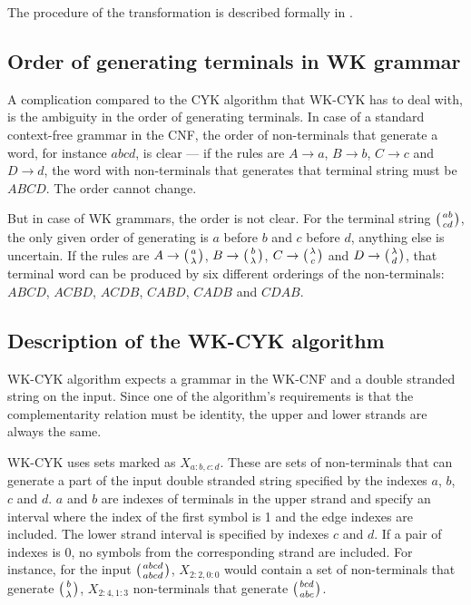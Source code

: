 The procedure of the transformation is described formally in \cite{WK_CYK}.


\subsection{Order of generating terminals in WK grammar}

A complication compared to the CYK algorithm that WK-CYK has to deal with, is the ambiguity in the order of generating terminals. In case of a standard context-free grammar in the CNF, the order of non-terminals that generate a word, for instance $abcd$, is clear --- if the rules are $A \rightarrow a$, $B \rightarrow b$, $C \rightarrow c$ and $D \rightarrow d$, the word with non-terminals that generates that terminal string must be $ABCD$. The order cannot change.

But in case of WK grammars, the order is not clear. For the terminal string $\wkpair{ab}{cd}$, the only given order of generating is $a$ before $b$ and $c$ before $d$, anything else is uncertain. If the rules are $A \rightarrow \wkpair{a}{\lambda}$, $B \rightarrow \wkpair{b}{\lambda}$, $C \rightarrow \wkpair{\lambda}{c}$ and $D \rightarrow \wkpair{\lambda}{d}$, that terminal word can be produced by six different orderings of the non-terminals:
$ABCD$, $ACBD$, $ACDB$, $CABD$, $CADB$ and $CDAB$.

\subsection{Description of the WK-CYK algorithm}
WK-CYK algorithm expects a grammar in the WK-CNF and a double stranded string on the input. Since one of the algorithm's requirements is that the complementarity relation must be identity, the upper and lower strands are always the same.

WK-CYK uses sets marked as $X_{a:b,c:d}$. These are sets of non-terminals that can generate a part of the input double stranded string specified by the indexes $a$, $b$, $c$ and $d$. $a$ and $b$ are indexes of terminals in the upper strand and specify an interval where the index of the first symbol is 1 and the edge indexes are included. The lower strand interval is specified by indexes $c$ and $d$. If a pair of indexes is 0, no symbols from the corresponding strand are included. For instance, for the input $\wkpair{abcd}{abcd}$, $X_{2:2,0:0}$ would contain a set of non-terminals that generate $\wkpair{b}{\lambda}$, $X_{2:4,1:3}$ non-terminals that generate $\wkpair{bcd}{abc}$.

